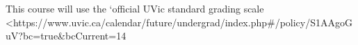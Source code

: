 This course will use the `official UVic standard grading scale <https://www.uvic.ca/calendar/future/undergrad/index.php#/policy/S1AAgoGuV?bc=true&bcCurrent=14%